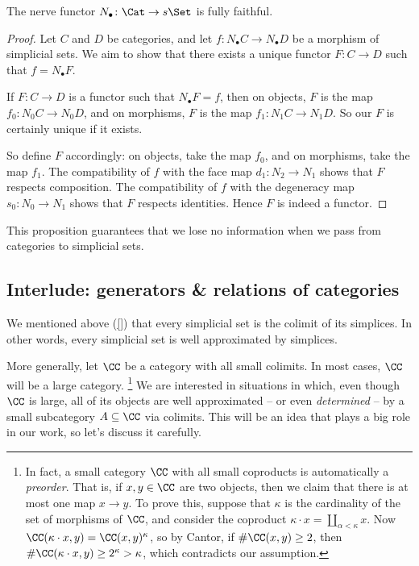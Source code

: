 \begin{proposition}
  The nerve functor $N_\bullet \colon \Cat \to s\Set$ is fully faithful.
\end{proposition}

\begin{proof}
  Let $C$ and $D$ be categories, and let $f \colon N_\bullet C \to N_\bullet D$ be a morphism of simplicial sets.
  We aim to show that there exists a unique functor $F \colon C \to D$ such that $f = N_\bullet F$.

  If $F \colon C \to D$ is a functor such that $N_\bullet F=f$, then
  on objects, $F$ is the map $f_0 \colon N_0C \to N_0D$, and
  on morphisms, $F$ is the map $f_1 \colon N_1C \to N_1D$.
  So our $F$ is certainly unique if it exists.

  So define $F$ accordingly: on objects, take the map $f_0$, and on morphisms, take the map $f_1$.
  The compatibility of $f$ with the face map $d_1 \colon N_2 \to N_1$ shows that $F$ respects composition.
  The compatibility of $f$ with the degeneracy map $s_0 \colon N_0 \to N_1$ shows that $F$ respects identities.
  Hence $F$ is indeed a functor.
\end{proof}

\noindent This proposition guarantees that we lose no information when we pass from categories to simplicial sets.

\subsection{Interlude: generators \& relations of categories}%
\label{sub:generatorsrelations}
We mentioned above (\ref{}) that every simplicial set is the colimit of its simplices.
In other words, every simplicial set is well approximated by simplices.

More generally, let $\CC$ be a category with all small colimits.
In most cases, $\CC$ will be a large category.%
\footnote{
  In fact, a small category $\CC$ with all small coproducts is automatically a \emph{preorder}.
  That is, if $x,y \in \CC$ are two objects, then we claim that there is at most one map $x \to y$.
  To prove this, suppose that $\kappa$ is the cardinality of the set of morphisms of $\CC$, and consider the coproduct $\kappa \cdot x = \coprod_{\alpha < \kappa} x$.
  Now $\CC(\kappa \cdot x, y) = \CC(x,y)^{\kappa}$, so by Cantor, if $\#\CC(x,y) \geq 2$, then $\#\CC(\kappa\cdot x, y) \geq 2^\kappa > \kappa$, which contradicts our assumption.
}
We are interested in situations in which, even though $\CC$ is large, all of its objects are well approximated -- or even \emph{determined} -- by a small subcategory $A \subseteq \CC$ via colimits.
This will be an idea that plays a big role in our work, so let's discuss it carefully.

